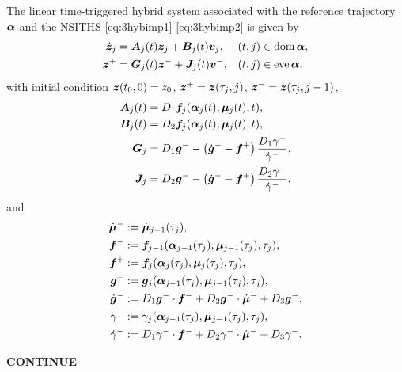 \documentclass[../DC2017114Bouma.tex]{subfiles}
\begin{document}
\begin{sloppypar}
\begin{mydef}[LTTHS]\label{def:3ltths}
The linear time-triggered hybrid system associated with the reference trajectory $\alphab$ and the NSITHS \eqref{eq:3hybimp1}-\eqref{eq:3hybimp2} is given by
\begin{align}
\dot{\zb}_j &= \Ab_j(t)\zb_j + \Bb_j(t)\vb_j, &(t,j)&\in \dom\alphab,\\
\zb^+ &= \Gb_j(t)\zb^- + \Jb_j(t)\vb^-, &(t,j)&\in \eve\alphab,
\end{align}
with initial condition $\zb(t_0,0)=z_0$, $\zb^+ = \zb(\tau_j,j)$, $\zb^- = \zb(\tau_j,j-1)$,
\begin{align*}
\Ab_j(t) &= D_1\fb_j(\alphab_j(t),\mub_j(t),t),\\
\Bb_j(t) &= D_2\fb_j(\alphab_j(t),\mub_j(t),t),\\
\Gb_j &= D_1\gb^- - \left(\dot{\gb}^- - \fb^+\right)\frac{D_1\gamma^-}{\dot{\gamma}^-},\\
\Jb_j &= D_2\gb^- - \left(\dot{\gb}^- - \fb^+\right)\frac{D_2\gamma^-}{\dot{\gamma}^-},
\end{align*}
and
\begin{align*}
\dot{\mub}^- &:= \dot{\mub}_{j-1}(\tau_j),\\
\fb^- &:= \fb_{j-1}(\alphab_{j-1}(\tau_j),\mub_{j-1}(\tau_j),\tau_j),\\
\fb^+ &:= \fb_j(\alphab_j(\tau_j),\mub_j(\tau_j),\tau_j),\\
\gb^- &:= \gb_{j}(\alphab_{j-1}(\tau_j),\mub_{j-1}(\tau_j),\tau_j),\\
\dot{\gb}^- &:= D_1\gb^-\cdot \fb^- + D_2\gb^-\cdot \dot{\mub}^- + D_3\gb^-,\\
\gamma^- &:= \gamma_j(\alphab_{j-1}(\tau_j),\mub_{j-1}(\tau_j),\tau_j),\\
\dot{\gamma}^- &:= D_1\gamma^-\cdot\fb^- + D_2\gamma^-\cdot\dot{\mub}^- + D_3\gamma^-.
\end{align*}
\end{mydef}
\end{sloppypar}
\textbf{CONTINUE}
\end{document}
